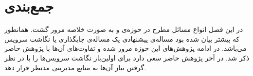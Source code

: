 \pagebreak
\section{جمع‌بندی}

در این فصل انواع مسائل مطرح در حوزه‌ی  و 
به صورت خلاصه مرور گشت. همانطور که پیشتر بیان شده بود مساله‌ی پیشنهادی یک مساله‌ی جایگذاری
یا نگاشت سرویس می‌باشد.
در ادامه پژوهش‌های این حوزه مرور شده و تفاوت‌های آن‌ها با پژوهش حاضر ذکر شد.
در آخر پژوهش حاضر سعی دارد برای اولین‌بار نگاشت سرویس‌ها را با در نظر گرفتن نیاز آن‌ها
به منابع مدیریتی مدنظر قرار دهد.